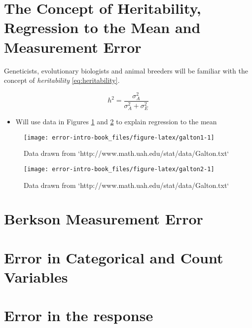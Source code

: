 \documentclass[]{book}
\providecommand{\tightlist}{%
  \setlength{\itemsep}{0pt}\setlength{\parskip}{0pt}}
\theoremstyle{definition}
\theoremstyle{definition}
\theoremstyle{definition}
\theoremstyle{remark}
\begin{document}
\section{The Concept of Heritability, Regression to the Mean and
Measurement Error}\label{sec:heritability}

Geneticists, evolutionary biologists and animal breeders will be
familiar with the concept of \emph{heritability} \eqref{eq:heritability}.

\begin{equation}
h^2 = \frac{\sigma_A^2}{\sigma_A^2 + \sigma_E^2}
\label{eq:heritability}
\end{equation}

\begin{itemize}
\tightlist
\item
  Will use data in Figures \ref{fig:galton1} and \ref{fig:galton2} to
  explain regression to the mean
\end{itemize}

\begin{figure}

{\centering \texttt{[image: error-intro-book\_files/figure-latex/galton1-1]} 

}

\caption{Data drawn from `http://www.math.uah.edu/stat/data/Galton.txt`}\label{fig:galton1}
\end{figure}

\begin{figure}

{\centering \texttt{[image: error-intro-book\_files/figure-latex/galton2-1]} 

}

\caption{Data drawn from `http://www.math.uah.edu/stat/data/Galton.txt`}\label{fig:galton2}
\end{figure}

\citep{fuller1987, galton1886}

\section{Berkson Measurement Error}\label{berkson-measurement-error-1}

\section{Error in Categorical and Count
Variables}\label{error-in-categorical-and-count-variables}

\section{Error in the response}\label{error-in-the-response}
\end{document}
